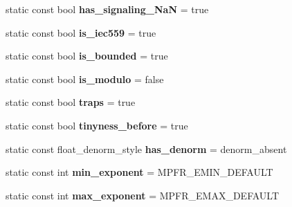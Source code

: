 \begin{DoxyCompactItemize}
static const bool {\bfseries has\+\_\+signaling\+\_\+\+NaN} = true
\item 
\mbox{\label{classstd_1_1numeric__limits_3_01mpfr_1_1mpreal_01_4_aeb90c866534a4e8debbd8e65bc823548}} 
static const bool {\bfseries is\+\_\+iec559} = true
\item 
\mbox{\label{classstd_1_1numeric__limits_3_01mpfr_1_1mpreal_01_4_af772818be18a180b54f9971422a569e0}} 
static const bool {\bfseries is\+\_\+bounded} = true
\item 
\mbox{\label{classstd_1_1numeric__limits_3_01mpfr_1_1mpreal_01_4_a5751614d542e91ecf683429f84f04cea}} 
static const bool {\bfseries is\+\_\+modulo} = false
\item 
\mbox{\label{classstd_1_1numeric__limits_3_01mpfr_1_1mpreal_01_4_aaf8a93c5e8cfa98ab6d83248352b16eb}} 
static const bool {\bfseries traps} = true
\item 
\mbox{\label{classstd_1_1numeric__limits_3_01mpfr_1_1mpreal_01_4_af49f00b00e654a522b36b466325ba6b5}} 
static const bool {\bfseries tinyness\+\_\+before} = true
\item 
\mbox{\label{classstd_1_1numeric__limits_3_01mpfr_1_1mpreal_01_4_a53b24cc5eb06f5b9764c36c4df8dc1bc}} 
static const float\+\_\+denorm\+\_\+style {\bfseries has\+\_\+denorm} = denorm\+\_\+absent
\item 
\mbox{\label{classstd_1_1numeric__limits_3_01mpfr_1_1mpreal_01_4_a42b54e43c835926659cfb89c4c43734b}} 
static const int {\bfseries min\+\_\+exponent} = M\+P\+F\+R\+\_\+\+E\+M\+I\+N\+\_\+\+D\+E\+F\+A\+U\+LT
\item 
\mbox{\label{classstd_1_1numeric__limits_3_01mpfr_1_1mpreal_01_4_a8159786345dc0fbe15333c72a3b05cca}} 
static const int {\bfseries max\+\_\+exponent} = M\+P\+F\+R\+\_\+\+E\+M\+A\+X\+\_\+\+D\+E\+F\+A\+U\+LT

\end{DoxyCompactItemize}
